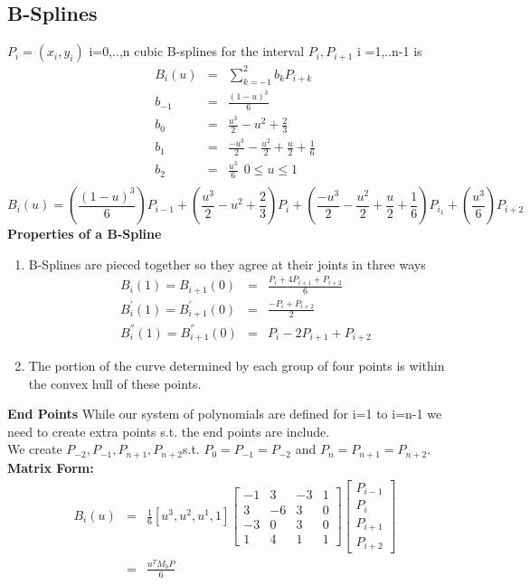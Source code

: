 \subsection*{B-Splines}
$P_i = (x_i,y_i)$ i=0,..,n  cubic B-splines for the interval $P_i,P_{i+1}$ i =1,..n-1 is
\begin{eqnarray*}
B_i(u) & = & \sum^{2}_{k=-1} b_k P_{i+k} \\
b_{-1} & = & \frac{(1-u)^3}{6} \\
b_{0} & = & \frac{u^3}{2}-u^2+\frac{2}{3} \\
b_{1} & = & \frac{-u^3}{2}-\frac{u^2}{2}+\frac{u}{2}+\frac{1}{6} \\
b_{2} & = & \frac{u^3}{6} \ \ 0 \leq u \leq 1 \\
\end{eqnarray*}
\begin{equation*}
B_i(u)  = 
 (\frac{(1-u)^3}{6}) P_{i-1} +
 (\frac{u^3}{2}-u^2+\frac{2}{3}) P_{i} +
 (\frac{-u^3}{2}-\frac{u^2}{2}+\frac{u}{2}+\frac{1}{6}) P_{i_1}
 +(\frac{u^3}{6})P_{i+2}
\end{equation*}
\textbf{Properties of a B-Spline}
\begin{enumerate}
\item
B-Splines are pieced together so they agree at their joints in three ways
\begin{eqnarray*}
B_i(1)=B_{i+1}(0)&=&\frac{P_i+4P_{i+1}+P_{i+2}}{6}\\
B_i^{'}(1)=B_{i+1}^{'}(0)&=&\frac{-P_i+P_{i+2}}{2}\\
B_i^{''}(1)=B_{i+1}^{''}(0)&=& P_i-2P_{i+1}+P_{i+2}
\end{eqnarray*}
\item
The portion of the curve determined by each group of four points is within
the convex hull of these points.
\end{enumerate}
\textbf{End Points}
While our system of polynomials are defined for i=1 to i=n-1 we need to 
create extra points s.t. the end points are include.\\
We create $P_{-2},P_{-1},P_{n+1},P_{n+2}$s.t. $P_0 = P_{-1}=P_{-2}$ and
$P_{n} = P_{n+1} = P_{n+2}$.\\
\textbf{Matrix Form:}
\begin{eqnarray*}
B_{i}(u) &=& \frac{1}{6}[u^3,u^2,u^1,1]
\left[\begin{array}{cccc}
-1 & 3 & -3 & 1 \\
3 & -6 & 3 & 0 \\
-3 & 0 & 3 & 0 \\
1 & 4 & 1 & 1 \end{array} \right]
\left[\begin{array}{c}
P_{i-1} \\
P_{i} \\
P_{i+1} \\
P_{i+2} \end{array} \right]\\
&=&\frac{u^{T}M_b P}{6}
\end{eqnarray*}
